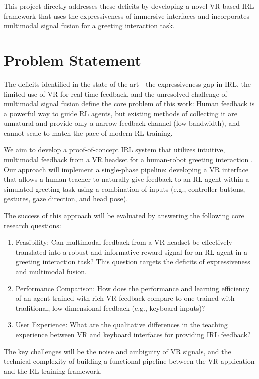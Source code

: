 \documentclass[rnd]{mas_proposal}
\begin{document}
This project directly addresses these deficits by developing a novel VR-based IRL framework that uses the expressiveness of immersive interfaces and incorporates multimodal signal fusion for a greeting interaction task.


\section{Problem Statement}
The deficits identified in the state of the art—the expressiveness gap in IRL, the limited use of VR for real-time feedback, and the unresolved challenge of multimodal signal fusion define the core problem of this work: Human feedback is a powerful way to guide RL agents, but existing methods of collecting it are unnatural and provide only a narrow feedback channel (low-bandwidth), and cannot scale to match the pace of modern RL training.

We aim to develop a proof-of-concept IRL system that utilizes intuitive, multimodal feedback from a VR headset for a human-robot greeting interaction \citep{7803357}. Our approach will implement a single-phase pipeline: developing a VR interface that allows a human teacher to naturally give feedback to an RL agent within a simulated greeting task using a combination of inputs (e.g., controller buttons, gestures, gaze direction, and head pose).

The success of this approach will be evaluated by answering the following core research questions:
\begin{enumerate}
    \item Feasibility: Can multimodal feedback from a VR headset be effectively translated into a robust and informative reward signal for an RL agent in a greeting interaction task? This question targets the deficits of expressiveness and multimodal fusion.
    \item Performance Comparison: How does the performance and learning efficiency of an agent trained with rich VR feedback compare to one trained with traditional, low-dimensional feedback (e.g., keyboard inputs)?
    \item User Experience: What are the qualitative differences in the teaching experience between VR and keyboard interfaces for providing IRL feedback?
\end{enumerate}

The key challenges will be the noise and ambiguity of VR signals, and the technical complexity of building a functional pipeline between the VR application and the RL training framework.
\end{document}
